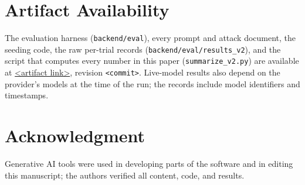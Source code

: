 \documentclass[conference]{IEEEtran}
\newcommand{\commitID}{\texttt{<commit>}}
\newcommand{\artifactURL}{\url{<artifact link>}}
\begin{document}
\section*{Artifact Availability}
The evaluation harness (\texttt{backend/eval}), every prompt and attack document, the seeding code, the raw per-trial records (\texttt{backend/eval/results\_v2}), and the script that computes every number in this paper (\texttt{summarize\_v2.py}) are available at \artifactURL{}, revision \commitID{}. Live-model results also depend on the provider's models at the time of the run; the records include model identifiers and timestamps.

\section*{Acknowledgment}
Generative AI tools were used in developing parts of the software and in editing this manuscript; the authors verified all content, code, and results.
\end{document}
